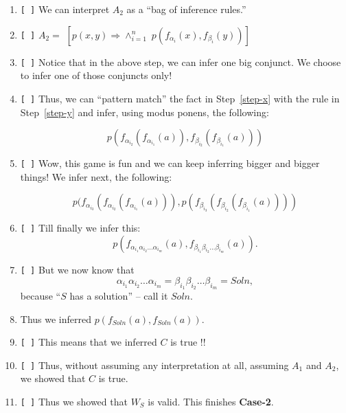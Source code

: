\documentclass[11pt]{article}
\begin{document}
\begin{Large}
\begin{enumerate}
 \item \verb|[ ]| We can interpret $A_2$ as a ``bag of inference
   rules.''
   
 \item \verb|[ ]| \label{step-y}
   $A_2 =$
$\textstyle 
   [p(x,y) \Rightarrow \wedge_{i=1}^{n} \; p(f_{\alpha_i}(x), f_{\beta_i}(y))] \;\;\;\;\;\;\;\; $

 \item \verb|[ ]|      Notice that in the above step,
   we can infer one big conjunct. We choose to infer one
   of those conjuncts only!
   
   
\item \verb|[ ]| Thus, we can ``pattern match'' the fact in
  Step~\ref{step-x} with the rule in   Step~\ref{step-y}
  and infer, using modus ponens, the following:

  \[ p(f_{\alpha_{i_2}} ( f_{\alpha_{i_1}} ( a)),
       f_{\beta_{i_2}} ( f_{\beta_{i_1}} ( a)) ) \]
  
  
  
     \item \verb|[ ]| Wow, this game is fun and we can keep inferring
       bigger and bigger things! We infer next, the following:


       \[ p(f_{\alpha_{i_3}} ( f_{\alpha_{i_2}} ( f_{\alpha_{i_1}} ( a))),
          p(f_{\beta_{i_3}} ( f_{\beta_{i_2}} ( f_{\beta_{i_1}} ( a)))) \]
       
        \item \verb|[ ]| Till finally we infer this:
\[ p(f_{\alpha_{i_1}\alpha_{i_2} \ldots\alpha_{i_m}}(a),
     f_{\beta_{i_1}\beta_{i_2} \ldots\beta_{i_m}}(a)). \]          

   \item \verb|[ ]|
     But we now know that
     \[ \alpha_{i_1}\alpha_{i_2}\ldots\alpha_{i_m} = \beta_{i_1}\beta_{i_2}\ldots\beta_{i_m} = Soln, \] because ``$S$ has a solution'' -- call it $Soln$.

   \item Thus  we inferred
     \( p(f_{Soln}(a), f_{Soln}(a)) \).

   \item \verb|[ ]|
     This means that we inferred $C$ is true !!


   \item \verb|[ ]|
     Thus, without assuming any interpretation at all,
     assuming $A_1$ and $A_2$, we showed that $C$ is true.

   \item \verb|[ ]|   Thus we showed that $W_S$ is valid. This
     finishes {\bf Case-2}.
  
\end{enumerate}

\end{Large}
\end{document}
